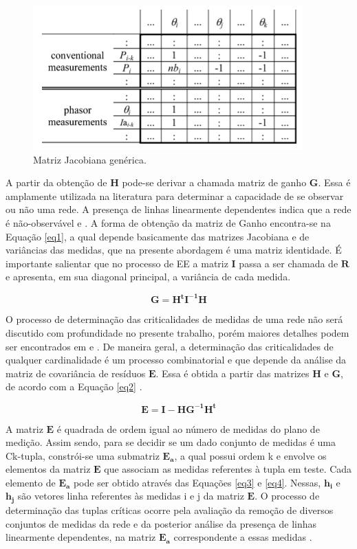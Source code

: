 \documentclass[12pt]{article}
\begin{document}
\begin{figure}[H]
	\centering 
	\includegraphics[scale=1.2]{figuras/Jacob.jpg}
	\caption{Matriz Jacobiana genérica.\cite{AbelTese16}}
	\label{fig2} %
\end{figure}

A partir da obtenção de $\mathbf{H}$ pode-se derivar a chamada matriz de ganho $\mathbf{G}$. Essa é amplamente utilizada na literatura para determinar a capacidade de se observar ou não uma rede. A presença de linhas linearmente dependentes indica que a rede é não-observável \cite{Mont85} e \cite{AburObserv00}. A forma de obtenção da matriz de Ganho encontra-se na Equação \ref{eq1}, a qual depende basicamente das matrizes Jacobiana e de variâncias das medidas, que na presente abordagem é uma matriz identidade. É importante salientar que no processo de EE a matriz $\mathbf{I}$ passa a ser chamada de $\mathbf{R}$ e apresenta, em sua diagonal principal, a variância de cada medida.

\begin{equation}
	\mathbf{G= H^tI^{-1}H}
\label{eq1}
\end{equation}

O processo de determinação das criticalidades de medidas de uma rede não será discutido com profundidade no presente trabalho, porém maiores detalhes podem ser encontrados em \cite{AbelTese16} e \cite{BB16}. De maneira geral, a determinação das criticalidades de qualquer cardinalidade é um processo combinatorial e que depende da análise da matriz de covariância de resíduos $\mathbf{E}$. Essa é obtida a partir das matrizes $\mathbf{H}$ e $\mathbf{G}$, de acordo com a Equação \ref{eq2} \cite{Quant13}.

\begin{equation}
	\mathbf{E= I - HG^{-1}H^t}
	\label{eq2}
\end{equation}

A matriz $\mathbf{E}$ é quadrada de ordem igual ao número de medidas do plano de medição. Assim sendo, para se decidir se um dado conjunto de medidas é uma Ck-tupla, constrói-se uma submatriz $\mathbf{E_a}$, a qual possui ordem k e envolve os elementos da matriz $\mathbf{E}$ que associam as medidas referentes à tupla em teste. Cada elemento de $\mathbf{E_a}$ pode ser obtido através das Equações \ref{eq3} e \ref{eq4}. Nessas, $\mathbf{h_i}$ e $\mathbf{h_j}$ são vetores linha referentes às medidas i e j da matriz $\mathbf{E}$. O processo de determinação das tuplas críticas ocorre pela avaliação da remoção de diversos conjuntos de medidas da rede e da posterior análise da presença de linhas linearmente dependentes, na matriz $\mathbf{E_a}$ correspondente a essas medidas \cite{Quant13}.
\end{document}

